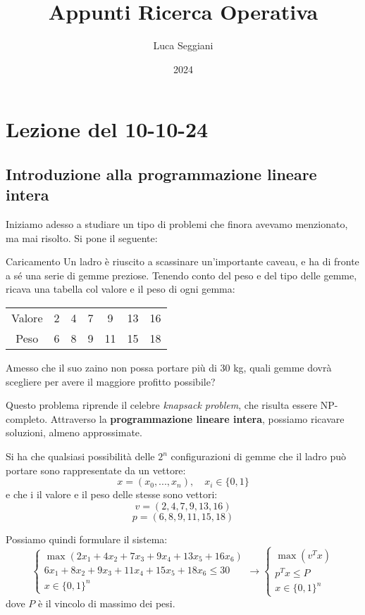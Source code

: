 \documentclass[a4paper,11pt]{article}
\title{Appunti Ricerca Operativa}
\author{Luca Seggiani}
\date{2024}
\begin{document}
\section{Lezione del 10-10-24}

\thispagestyle{empty}
\pagestyle{fancy}

\subsection{Introduzione alla programmazione lineare intera}
Iniziamo adesso a studiare un tipo di problemi che finora avevamo menzionato, ma mai risolto.
Si pone il seguente:

\begin{problem}{Caricamento}
	Un ladro è riuscito a scassinare un'importante caveau, e ha di fronte a sé una serie di gemme preziose.
	Tenendo conto del peso e del tipo delle gemme, ricava una tabella col valore e il peso di ogni gemma:
	
	\center {}
	\begin{tabular} { | c || c | c | c | c | c| c |}
		\hline
		Valore & 2 & 4 & 7 & 9 & 13 & 16 \\
		Peso & 6 & 8 & 9 & 11 & 15 & 18 \\
		\hline
	\end{tabular}

	\par\bigskip

	\raggedright
	Amesso che il suo zaino non possa portare più di 30 kg, quali gemme dovrà scegliere per avere il maggiore profitto possibile?
\end{problem}

Questo problema riprende il celebre \textit{knapsack problem}, che risulta essere NP-completo.
Attraverso la \textbf{programmazione lineare intera}, possiamo ricavare soluzioni, almeno approssimate.

Si ha che qualsiasi possibilità delle $2^n$ configurazioni di gemme che il ladro può portare sono rappresentate da un vettore:
$$ 
x = (x_0, ..., x_n), \quad x_i \in \{ 0, 1 \}
$$
e che i il valore e il peso delle stesse sono vettori:
$$
v = \left( 2, 4, 7, 9, 13, 16 \right)
$$
$$
p = \left( 6, 8, 9, 11, 15, 18 \right)
$$

Possiamo quindi formulare il sistema:
\[
	\begin{cases}
		\max \left( 2x_1 + 4x_2 + 7x_3 + 9x_4 + 13x_5 + 16x_6 \right) \\ 
		6x_1 + 8x_2 + 9x_3 + 11x_4 + 15x_5 + 18x_6 \leq 30 \\
		x \in \{ 0, 1 \}^n
	\end{cases}
	\rightarrow
	\begin{cases}
		\max \left( v^T x \right) \\
		p^T x \leq P \\
		x \in \{ 0, 1 \}^n
	\end{cases}
\]
dove $P$ è il vincolo di massimo dei pesi.
\end{document}
